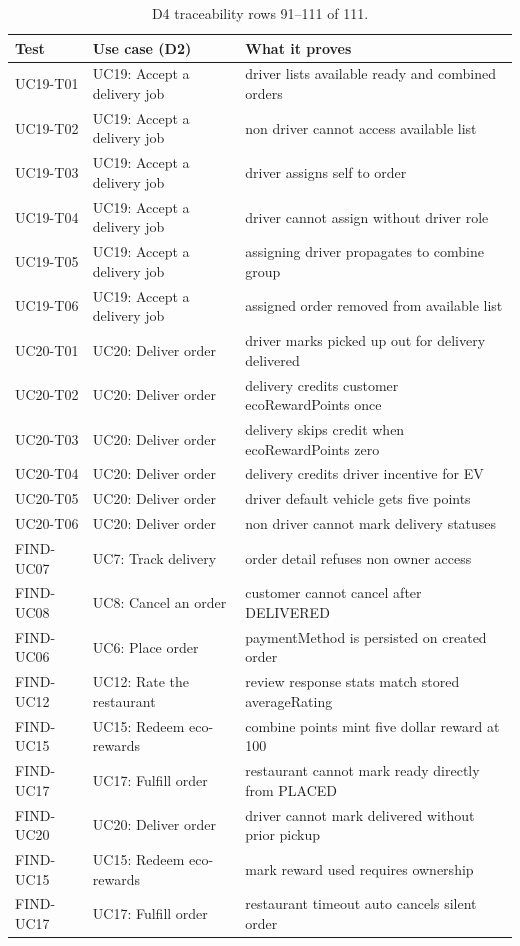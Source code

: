 \begin{table}[t]
\caption{D4 traceability rows 91--111 of 111.}
\label{tab:d4t4}
\centering\scriptsize
\begin{tabular}{p{3.2cm}p{4.0cm}p{5.8cm}}
\toprule
Test & Use case (D2) & What it proves \\
\midrule
UC19-T01 & UC19: Accept a delivery job & driver lists available ready and combined orders \\
UC19-T02 & UC19: Accept a delivery job & non driver cannot access available list \\
UC19-T03 & UC19: Accept a delivery job & driver assigns self to order \\
UC19-T04 & UC19: Accept a delivery job & driver cannot assign without driver role \\
UC19-T05 & UC19: Accept a delivery job & assigning driver propagates to combine group \\
UC19-T06 & UC19: Accept a delivery job & assigned order removed from available list \\
UC20-T01 & UC20: Deliver order & driver marks picked up out for delivery delivered \\
UC20-T02 & UC20: Deliver order & delivery credits customer ecoRewardPoints once \\
UC20-T03 & UC20: Deliver order & delivery skips credit when ecoRewardPoints zero \\
UC20-T04 & UC20: Deliver order & delivery credits driver incentive for EV \\
UC20-T05 & UC20: Deliver order & driver default vehicle gets five points \\
UC20-T06 & UC20: Deliver order & non driver cannot mark delivery statuses \\
FIND-UC07 & UC7: Track delivery & order detail refuses non owner access \\
FIND-UC08 & UC8: Cancel an order & customer cannot cancel after DELIVERED \\
FIND-UC06 & UC6: Place order & paymentMethod is persisted on created order \\
FIND-UC12 & UC12: Rate the restaurant & review response stats match stored averageRating \\
FIND-UC15 & UC15: Redeem eco-rewards & combine points mint five dollar reward at 100 \\
FIND-UC17 & UC17: Fulfill order & restaurant cannot mark ready directly from PLACED \\
FIND-UC20 & UC20: Deliver order & driver cannot mark delivered without prior pickup \\
FIND-UC15 & UC15: Redeem eco-rewards & mark reward used requires ownership \\
FIND-UC17 & UC17: Fulfill order & restaurant timeout auto cancels silent order \\
\bottomrule
\end{tabular}
\end{table}


